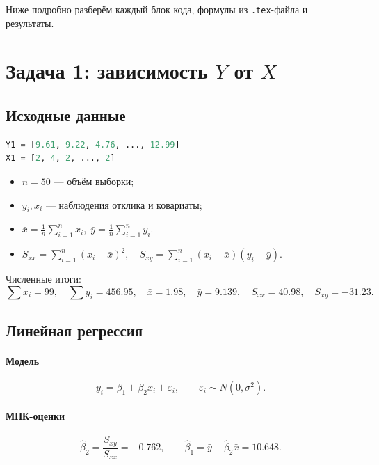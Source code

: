 \documentclass[12pt]{article}
\begin{document}
Ниже подробно разберём каждый блок кода, формулы из \texttt{.tex}-файла и результаты.

\section{Задача 1: зависимость \(Y\) от \(X\)}

\subsection{Исходные данные}

\begin{lstlisting}[language=Python,caption=Фрагмент кода (данные задачи 1)]
Y1 = [9.61, 9.22, 4.76, ..., 12.99]   
X1 = [2, 4, 2, ..., 2]                
\end{lstlisting}

\begin{itemize}
  \item \(n = 50\) — объём выборки;
  \item \(y_i, x_i\) — наблюдения отклика и ковариаты;
  \item
    \(
      \bar x = \frac1n\sum_{i=1}^n x_i,\;
      \bar y = \frac1n\sum_{i=1}^n y_i.
    \)
  \item
    \(
      S_{xx}= \sum_{i=1}^n (x_i-\bar x)^2,\quad
      S_{xy}= \sum_{i=1}^n (x_i-\bar x)(y_i-\bar y).
    \)
\end{itemize}

Численные итоги:
\[
  \sum x_i = 99,\quad
  \sum y_i = 456.95,\quad
  \bar x = 1.98,\quad
  \bar y = 9.139,\quad
  S_{xx}=40.98,\quad
  S_{xy}=-31.23.
\]

\subsection{Линейная регрессия}

\paragraph{Модель}
\[
  y_i = \beta_1 + \beta_2 x_i + \varepsilon_i,\qquad
  \varepsilon_i\sim N(0,\sigma^2).
\]

\paragraph{МНК-оценки}
\[
  \hat\beta_2 = \frac{S_{xy}}{S_{xx}} = -0.762,\qquad
  \hat\beta_1 = \bar y - \hat\beta_2\bar x = 10.648.
\]
\end{document}

